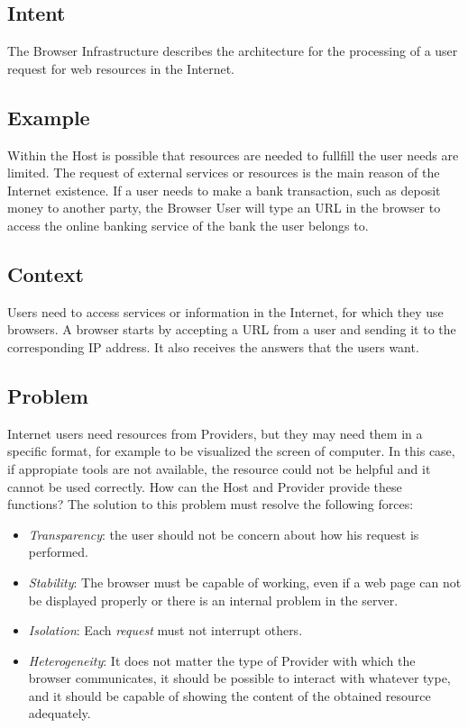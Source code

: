 \documentclass{sig-alternate-05-2015}
\begin{document}
  \subsection*{Intent}

  The Browser Infrastructure describes the architecture for the processing of a user request for web resources in the Internet.

  \subsection*{Example}
  Within the Host is possible that resources are needed to fullfill the user needs are limited. The request of external services or resources is the main reason of the Internet existence. If a user needs to make a bank transaction, such as deposit money to another party, the Browser User will type an URL in the browser to access the online banking service of the bank the user belongs to.
  
  \subsection*{Context}
  Users need to access services or information in the Internet, for which they use browsers. A browser starts by accepting a URL from a user and sending it to the corresponding IP address. It also receives the answers that the users want.

  \subsection*{Problem}
  Internet users need resources from Providers, but they may need them in a specific format, for example to be visualized the screen of computer. In this case, if appropiate tools are not available, the resource could not be helpful and it cannot be used correctly. How can the Host and Provider provide these functions? The solution to this problem must resolve the following forces:
  \begin{itemize}
    \item \textit{Transparency}: the user should not be concern about how his request is performed. 
    \item \textit{Stability}: The browser must be capable of working, even if a web page can not be displayed properly or there is an internal problem in the server.
    \item \textit{Isolation}: Each \textit{request} must not interrupt others.
    \item \textit{Heterogeneity}: It does not matter the type of Provider with which the browser communicates, it should be possible to interact with whatever type, and it should be capable of showing the content of the obtained resource adequately.
  \end{itemize}
\end{document}
